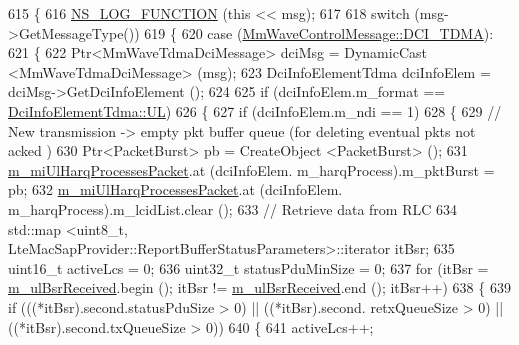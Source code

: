 \begin{DoxyCode}
615 \{
616         \hyperlink{log-macros-disabled_8h_a90b90d5bad1f39cb1b64923ea94c0761}{NS\_LOG\_FUNCTION} (\textcolor{keyword}{this} << msg);
617 
618         \textcolor{keywordflow}{switch} (msg->GetMessageType())
619         \{
620         \textcolor{keywordflow}{case} (\hyperlink{classns3_1_1MmWaveControlMessage_afd7af53dea4ef8b652cf206acd508869a3def507a310c2ded862e95b929cfd34b}{MmWaveControlMessage::DCI\_TDMA}):
621                 \{
622                 Ptr<MmWaveTdmaDciMessage> dciMsg = DynamicCast <MmWaveTdmaDciMessage> (msg);
623                 DciInfoElementTdma dciInfoElem = dciMsg->GetDciInfoElement ();
624 
625                 \textcolor{keywordflow}{if} (dciInfoElem.m\_format == \hyperlink{structns3_1_1DciInfoElementTdma_af998ccd3b1e03836c113d353facc76f4a8611bf12ef88d043baf0e591bc63b314}{DciInfoElementTdma::UL})
626                 \{
627                         \textcolor{keywordflow}{if} (dciInfoElem.m\_ndi == 1)
628                         \{
629                                 \textcolor{comment}{// New transmission -> empty pkt buffer queue (for deleting eventual pkts
       not acked )}
630                                 Ptr<PacketBurst> pb = CreateObject <PacketBurst> ();
631                                 \hyperlink{classns3_1_1MmWaveUeMac_a53afd2059b620c2f3dd1d9791c4df83c}{m\_miUlHarqProcessesPacket}.at (dciInfoElem.
      m\_harqProcess).m\_pktBurst = pb;
632                                 \hyperlink{classns3_1_1MmWaveUeMac_a53afd2059b620c2f3dd1d9791c4df83c}{m\_miUlHarqProcessesPacket}.at (dciInfoElem.
      m\_harqProcess).m\_lcidList.clear ();
633                                 \textcolor{comment}{// Retrieve data from RLC}
634                                 std::map <uint8\_t,
       LteMacSapProvider::ReportBufferStatusParameters>::iterator itBsr;
635                                 uint16\_t activeLcs = 0;
636                                 uint32\_t statusPduMinSize = 0;
637                                 \textcolor{keywordflow}{for} (itBsr = \hyperlink{classns3_1_1MmWaveUeMac_a4fedb11c547b798c1546f082e147ba03}{m\_ulBsrReceived}.begin (); itBsr != 
      \hyperlink{classns3_1_1MmWaveUeMac_a4fedb11c547b798c1546f082e147ba03}{m\_ulBsrReceived}.end (); itBsr++)
638                                 \{
639                                         \textcolor{keywordflow}{if} (((*itBsr).second.statusPduSize > 0) || ((*itBsr).second.
      retxQueueSize > 0) || ((*itBsr).second.txQueueSize > 0))
640                                         \{
641                                                 activeLcs++;

\end{DoxyCode}

